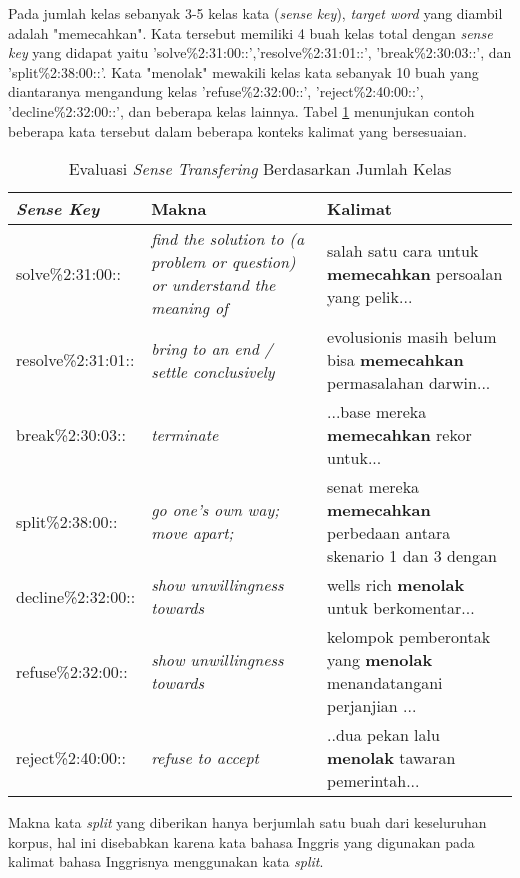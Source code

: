 Pada jumlah kelas sebanyak 3-5 kelas kata (\textit{sense key}), \textit{target word} yang diambil adalah "memecahkan". Kata tersebut memiliki 4 buah kelas total dengan \textit{sense key} yang didapat yaitu 'solve\%2:31:00::','resolve\%2:31:01::', 'break\%2:30:03::', dan 'split\%2:38:00::'. Kata "menolak" mewakili kelas kata sebanyak 10 buah yang diantaranya mengandung kelas 'refuse\%2:32:00::', 'reject\%2:40:00::', 'decline\%2:32:00::', dan beberapa kelas lainnya. Tabel \ref{table:number-classes-sense-transfering-evaluation} menunjukan contoh beberapa kata tersebut dalam beberapa konteks kalimat yang bersesuaian.

\begin{table}
	\centering
	\caption{Evaluasi \textit{Sense Transfering} Berdasarkan Jumlah Kelas}
	\label{table:number-classes-sense-transfering-evaluation}
	\begin{tabular}{|p{4cm}|p{4cm}|p{4cm}|}
		\hline
		\textit{Sense Key} & Makna & Kalimat
		\\ \hline
		solve\%2:31:00::  & 
		\textit{find the solution to (a problem or question) or understand the meaning of}   & 
		salah satu cara untuk \textbf{memecahkan} persoalan yang pelik...
		\\ \hline
		resolve\%2:31:01:: & 
		\textit{bring to an end / settle conclusively}   & 
		evolusionis masih belum bisa \textbf{memecahkan} permasalahan darwin...
		\\ \hline
		break\%2:30:03:: & 
		\textit{terminate}   & 
		...base mereka \textbf{memecahkan} rekor untuk...
		\\ \hline
		split\%2:38:00:: &
		\textit{go one's own way; move apart;} &
		senat mereka \textbf{memecahkan} perbedaan antara skenario 1 dan 3 dengan
		\\ \hline
		decline\%2:32:00:: &
		\textit{show unwillingness towards} &
		wells rich \textbf{menolak} untuk berkomentar...
		\\ \hline
		refuse\%2:32:00:: &
		\textit{show unwillingness towards} &
		kelompok pemberontak yang \textbf{menolak} menandatangani perjanjian ...
		\\ \hline
		reject\%2:40:00:: &
		\textit{refuse to accept} &
		..dua pekan lalu \textbf{menolak} tawaran pemerintah...
		\\ \hline
	\end{tabular}
\end{table}

Makna kata \textit{split} yang diberikan hanya berjumlah satu buah dari keseluruhan korpus, hal ini disebabkan karena kata bahasa Inggris yang digunakan pada kalimat bahasa Inggrisnya menggunakan kata \textit{split}.
